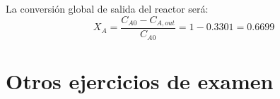 La conversión global de salida del reactor será:
\begin{equation*}
	X_A = \frac{C_{A0} - C_{A,out}}{C_{A0}} = 1 - 0.3301 = 0.6699
\end{equation*}

\begin{center}
\end{center}

\newpage
\section{Otros ejercicios de examen}

